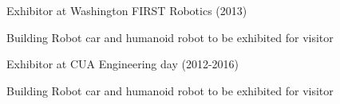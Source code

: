 \begin{cventries}
  \cventry
    {Exhibitor at Washington FIRST Robotics  (2013)}
    {}
    {}
    {}
    {
      \begin{cvitems}
        \item {Building Robot car and humanoid robot to be exhibited for visitor}
      \end{cvitems}
    }
  \cventry
    {Exhibitor at CUA Engineering day (2012-2016)}
    {}
    {}
    {}
    {
      \begin{cvitems}
        \item {Building Robot car and humanoid robot to be exhibited for visitor}
      \end{cvitems}
    }
\end{cventries}

